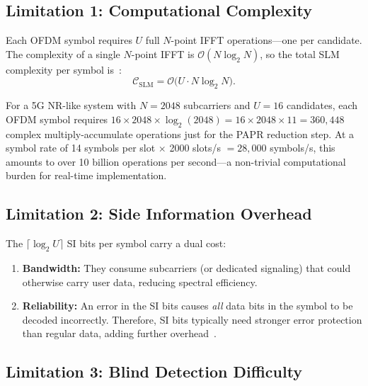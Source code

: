 \subsection{Limitation 1: Computational Complexity}

Each OFDM symbol requires $U$ full $N$-point IFFT operations---one per
candidate.  The complexity of a single $N$-point IFFT is
$\mathcal{O}(N\log_2 N)$, so the total SLM complexity per symbol
is~\cite{ali2016new,da2024survey}:
\begin{equation}
    \mathcal{C}_{\mathrm{SLM}} = \mathcal{O}\bigl(U \cdot N\log_2 N\bigr).
    \label{eq:slm_complexity}
\end{equation}

\begin{workingexample}
    For a 5G NR-like system with $N=2048$ subcarriers and $U=16$ candidates,
    each OFDM symbol requires $16 \times 2048 \times \log_2(2048)
    = 16 \times 2048 \times 11 = 360{,}448$ complex multiply-accumulate
    operations just for the PAPR reduction step.  At a symbol rate of
    14 symbols per slot $\times$ 2000 slots/s $= 28{,}000$ symbols/s,
    this amounts to over 10 billion operations per second---a non-trivial
    computational burden for real-time implementation.
\end{workingexample}

\subsection{Limitation 2: Side Information Overhead}

The $\lceil\log_2 U\rceil$ SI bits per symbol carry a dual cost:
\begin{enumerate}
    \item \textbf{Bandwidth:} They consume subcarriers (or dedicated
          signaling) that could otherwise carry user data, reducing
          spectral efficiency.
    \item \textbf{Reliability:} An error in the SI bits causes \emph{all}
          data bits in the symbol to be decoded incorrectly.
          Therefore, SI bits typically need stronger error protection
          than regular data, adding further overhead~\cite{da2024survey}.
\end{enumerate}

\subsection{Limitation 3: Blind Detection Difficulty}

